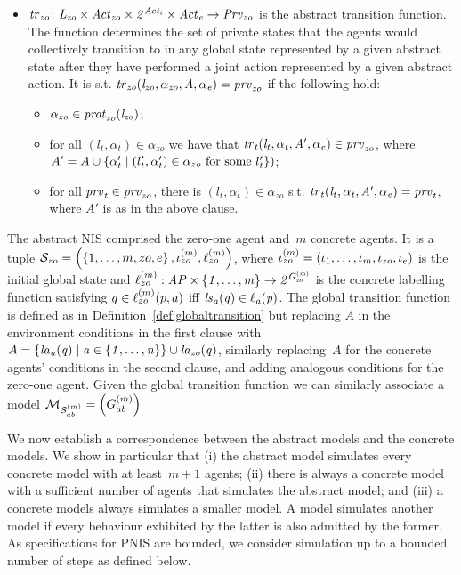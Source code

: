 \begin{definition}
\begin{itemize}
    \item $\it{tr}_{zo} \colon L_{zo} \times \it{Act}_{zo} \times 2^{\it{Act}_{t}} 
    \times \it{Act}_{e} \rightarrow \it{Prv}_{zo}$ is the abstract transition function.
    The function determines the set of private states that the agents would
    collectively transition to in any global state represented by a given
    abstract state after they have performed a joint action represented by a
    given abstract action. It is s.t. $\it{tr}_{zo}(l_{zo}, \alpha_{zo}, A, \alpha_e)
    = \it{prv}_{zo}$ if the following hold:
    \begin{itemize}
        \item $\alpha_{zo} \in \it{prot}_{zo}(l_{zo})$; 
        \item for all $(l_t, \alpha_t) \in \alpha_{zo}$ we have that $\it{tr}_{t}(l_t,
        \alpha_t, A', \alpha_e) \in \it{prv}_{zo}$, where $A' = A \cup \left \{ \alpha'_t
        \mid (l'_t, \alpha'_t) \in \alpha_{zo} \text{ for some } l'_t \right \})$;
        \item for all $\it{prv}_{t} \in \it{prv}_{zo}$, there is $(l_t, \alpha_t) \in
        \alpha_{zo}$ s.t. $\it{tr}_{t}(l_t, \alpha_t, A', \alpha_e) = \it{prv}_{t}$, where
        $A'$ is as in the above clause.  
    \end{itemize}
\end{itemize}
\end{definition}

The abstract  NIS comprised the zero-one agent and~$m$ concrete agents. It is a
tuple $\mathcal S_{zo} = \left ( \left \{ 1,\ldots,m,zo,e \right \}, \iota^{({m})}_{zo},
\ell^{(m)}_{zo} \right )$, where $\iota^{({m})}_{zo} = \left ( \iota_{1}, \ldots, \iota_{m}, \iota_{zo}, \iota_{e} \right )$ is the initial global state and $\ell^{(m)}_{zo} :
\it{AP} \times \left \{ 1, \ldots, m  \right \} \rightarrow 2^{G^{(m)}_{zo}}$ is the
concrete labelling function satisfying $q \in \ell^{(m)}_{zo}(p,a)$ iff
$\it{ls}_{a}(q) \in \ell_{a}(p)$.  The global transition function is defined as in
Definition~\ref{def:globaltransition} but replacing $A$ in the environment
conditions in the first clause with $A = \left \{ \it{la}_{a}({q}) \mid a \in
\left \{ 1,\ldots,n \right \} \right \} \cup \it{la}_{zo}({q})$, similarly replacing~$A$ for the concrete
agents' conditions in the second clause, and adding analogous conditions for the
zero-one agent. Given the global transition function we can similarly associate
a model  $\mathcal{M}_{\mathcal{S}_{ab}^{(m)}} = \left ( G^{(m)}_{ab} \right )$

We now establish a correspondence between the abstract models and the concrete
models. We show in particular that (i) the abstract model simulates every
concrete model with at least~$m+1$ agents; (ii) there is always a concrete model
with a sufficient number of agents that simulates the abstract model; and (iii)
a concrete models always simulates a smaller model. A model simulates another
model if every behaviour exhibited by the latter is also admitted by the former.
As specifications for PNIS are bounded, we consider simulation up to a bounded
number of steps as defined below.

